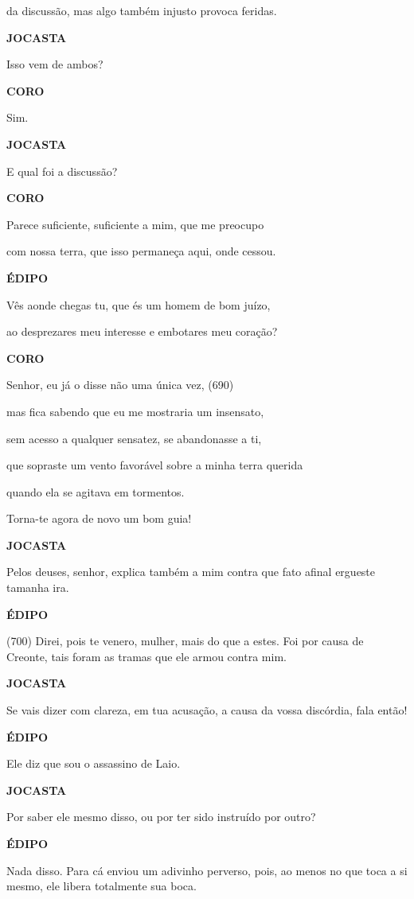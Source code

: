 da discussão, mas algo também injusto provoca feridas.

\textbf{JOCASTA}

Isso vem de ambos?

\textbf{CORO}

Sim.

\textbf{JOCASTA}

E qual foi a discussão?

\textbf{CORO}

Parece suficiente, suficiente a mim, que me preocupo

com nossa terra, que isso permaneça aqui, onde cessou.

\textbf{ÉDIPO}

Vês aonde chegas tu, que és um homem de bom juízo,

ao desprezares meu interesse e embotares meu coração?

\textbf{CORO}

Senhor, eu já o disse não uma única vez, (690)

mas fica sabendo que eu me mostraria um insensato,

sem acesso a qualquer sensatez, se abandonasse a ti,

que sopraste um vento favorável sobre a minha terra querida

quando ela se agitava em tormentos.

Torna-te agora de novo um bom guia!

\textbf{JOCASTA}

Pelos deuses, senhor, explica também a mim contra que fato afinal
ergueste tamanha ira.

\textbf{ÉDIPO}

(700) Direi, pois te venero, mulher, mais do que a estes. Foi por causa
de Creonte, tais foram as tramas que ele armou contra mim.

\textbf{JOCASTA}

Se vais dizer com clareza, em tua acusação, a causa da vossa discórdia,
fala então!

\textbf{ÉDIPO}

Ele diz que sou o assassino de Laio.

\textbf{JOCASTA}

Por saber ele mesmo disso, ou por ter sido instruído por outro?

\textbf{ÉDIPO}

Nada disso. Para cá enviou um adivinho perverso, pois, ao menos no que
toca a si mesmo, ele libera totalmente sua boca.

